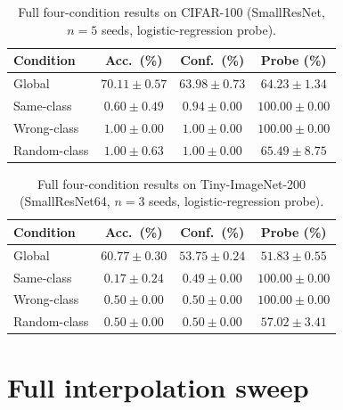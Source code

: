 \documentclass{article}
\begin{document}
\begin{table}[h]
\caption{Full four-condition results on CIFAR-100 (SmallResNet, $n{=}5$ seeds, logistic-regression probe).}
\label{tab:cifar100}
\centering
\small
\begin{tabular}{@{}lccc@{}}
\toprule
Condition & Acc.\ (\%) & Conf.\ (\%) & Probe (\%) \\
\midrule
Global       & $70.11 \pm 0.57$  & $63.98 \pm 0.73$  & $64.23 \pm 1.34$   \\
Same-class   & $0.60 \pm 0.49$   & $0.94 \pm 0.00$   & $100.00 \pm 0.00$  \\
Wrong-class  & $1.00 \pm 0.00$   & $1.00 \pm 0.00$   & $100.00 \pm 0.00$  \\
Random-class & $1.00 \pm 0.63$   & $1.00 \pm 0.00$   & $65.49 \pm 8.75$   \\
\bottomrule
\end{tabular}
\end{table}

\begin{table}[h]
\caption{Full four-condition results on Tiny-ImageNet-200 (SmallResNet64, $n{=}3$ seeds, logistic-regression probe).}
\label{tab:tinyimagenet}
\centering
\small
\begin{tabular}{@{}lccc@{}}
\toprule
Condition & Acc.\ (\%) & Conf.\ (\%) & Probe (\%) \\
\midrule
Global       & $60.77 \pm 0.30$  & $53.75 \pm 0.24$  & $51.83 \pm 0.55$   \\
Same-class   & $0.17 \pm 0.24$   & $0.49 \pm 0.00$   & $100.00 \pm 0.00$  \\
Wrong-class  & $0.50 \pm 0.00$   & $0.50 \pm 0.00$   & $100.00 \pm 0.00$  \\
Random-class & $0.50 \pm 0.00$   & $0.50 \pm 0.00$   & $57.02 \pm 3.41$   \\
\bottomrule
\end{tabular}
\end{table}

\section{Full interpolation sweep}
\label{app:interp}
\end{document}
